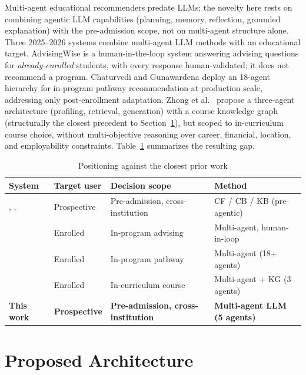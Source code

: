 \documentclass[conference]{IEEEtran}
\begin{document}
Multi-agent educational recommenders predate LLMs; the novelty here rests on combining
agentic LLM capabilities (planning, memory, reflection, grounded explanation) with the
pre-admission scope, not on multi-agent structure alone. Three 2025--2026 systems combine
multi-agent LLM methods with an educational target. AdvisingWise \cite{advisingwise} is a human-in-the-loop system
answering advising questions for \emph{already-enrolled} students, with every response
human-validated; it does not recommend a program. Chaturvedi and Gunawardena
\cite{agenticedurec} deploy an 18-agent hierarchy for in-program pathway recommendation at
production scale, addressing only post-enrollment adaptation. Zhong et al.\
\cite{onlinecoursemaskg} propose a three-agent architecture (profiling, retrieval,
generation) with a course knowledge graph (structurally the closest precedent to
Section~\ref{sec:architecture}), but scoped to in-curriculum course choice, without
multi-objective reasoning over career, financial, location, and employability constraints.
Table~\ref{tab:gap} summarizes the resulting gap.

\begin{table}[t]
\caption{Positioning against the closest prior work}
\label{tab:gap}
\centering
\begin{tabular}{@{}p{1.6cm}p{1.5cm}p{1.6cm}p{1.5cm}@{}}
\toprule
\textbf{System} & \textbf{Target user} & \textbf{Decision scope} & \textbf{Method} \\
\midrule
\cite{hrspca}, \cite{studieme}, \cite{multidmensionalrecsysuni} & Prospective & Pre-admission, cross-institution & CF / CB / KB (pre-agentic) \\
\cite{advisingwise} & Enrolled & In-program advising & Multi-agent, human-in-loop \\
\cite{agenticedurec} & Enrolled & In-program pathway & Multi-agent (18+ agents) \\
\cite{onlinecoursemaskg} & Enrolled & In-curriculum course & Multi-agent + KG (3 agents) \\
\textbf{This work} & \textbf{Prospective} & \textbf{Pre-admission, cross-institution} & \textbf{Multi-agent LLM (5 agents)} \\
\bottomrule
\end{tabular}
\end{table}

\section{Proposed Architecture}
\label{sec:architecture}
\end{document}
